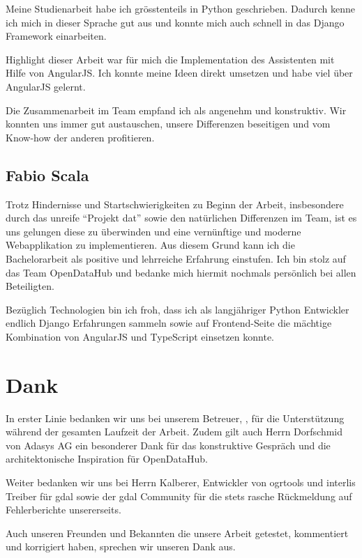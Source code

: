 Meine Studienarbeit habe ich grösstenteils in Python geschrieben. Dadurch kenne ich mich in dieser Sprache gut aus und konnte mich auch schnell in das Django Framework einarbeiten.

Highlight dieser Arbeit war für mich die Implementation des Assistenten mit Hilfe von AngularJS. Ich konnte meine Ideen direkt umsetzen und habe viel über AngularJS gelernt.

Die Zusammenarbeit im Team empfand ich als angenehm und konstruktiv. Wir konnten uns immer gut austauschen, unsere Differenzen beseitigen und vom Know-how der anderen profitieren.

\subsection{Fabio Scala}
Trotz Hindernisse und Startschwierigkeiten zu Beginn der Arbeit, insbesondere durch das unreife ``Projekt dat'' sowie den natürlichen Differenzen im Team, ist es uns gelungen diese zu überwinden und eine vernünftige und moderne Webapplikation zu implementieren. Aus diesem Grund kann ich die Bachelorarbeit als positive und lehrreiche Erfahrung einstufen. Ich bin stolz auf das Team OpenDataHub und bedanke mich hiermit nochmals persönlich bei allen Beteiligten.

Bezüglich Technologien bin ich froh, dass ich als langjähriger Python Entwickler endlich Django Erfahrungen sammeln sowie auf Frontend-Seite die mächtige Kombination von AngularJS und TypeScript einsetzen konnte.


\section{Dank}
In erster Linie bedanken wir uns bei unserem Betreuer, \proff, für die Unterstützung während der gesamten Laufzeit der Arbeit. Zudem gilt auch Herrn Dorfschmid von Adasys AG ein besonderer Dank für das konstruktive Gespräch und die architektonische Inspiration für OpenDataHub. 

Weiter bedanken wir uns bei Herrn Kalberer, Entwickler von ogrtools und \gls{interlis} Treiber für \gls{gdal} sowie der \gls{gdal} Community für die stets rasche Rückmeldung auf Fehlerberichte unsererseits.

Auch unseren Freunden und Bekannten die unsere Arbeit getestet, kommentiert und korrigiert haben, sprechen wir unseren Dank aus.
